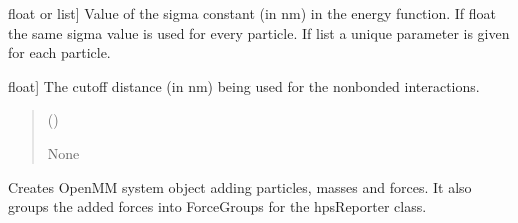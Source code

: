 \documentclass[letterpaper,10pt,english]{sphinxmanual}
\begin{document}
\begin{fulllineitems}
\begin{fulllineitems}
\begin{description}
\sphinxlineitem{sigma}{[}float or list{]}
\sphinxAtStartPar
Value of the sigma constant (in nm) in the energy function. If float the
same sigma value is used for every particle. If list a unique
parameter is given for each particle.

\sphinxlineitem{cutoff}{[}float{]}
\sphinxAtStartPar
The cutoff distance (in nm) being used for the non\sphinxhyphen{}bonded interactions.

\end{description}
\begin{quote}\begin{description}
\sphinxAtStartPar
{} (\sphinxstyleliteralemphasis{\sphinxupquote{, }}) \textendash{} 

\sphinxAtStartPar
None

\end{description}\end{quote}

\end{fulllineitems}


\begin{fulllineitems}
\label{\detokenize{modules/system:hps.core.system.createSystemObject}}
\pysigstartsignatures
{}
\pysigstopsignatures
\sphinxAtStartPar
Creates OpenMM system object adding particles, masses and forces.
It also groups the added forces into Force\sphinxhyphen{}Groups for the hpsReporter
class.


\end{fulllineitems}
\end{fulllineitems}
\end{document}
